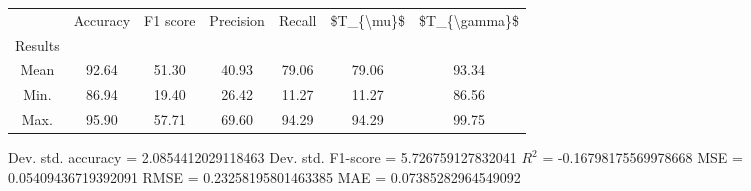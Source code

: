\begin{tabular}{|c|c|c|c|c|c|c|}
\toprule
{} &  Accuracy &  F1 score &  Precision &  Recall &  \$T\_\{\textbackslash mu\}\$ &  \$T\_\{\textbackslash gamma\}\$ \\
Results &           &           &            &         &            &               \\
\hline
Mean    &     92.64 &     51.30 &      40.93 &   79.06 &      79.06 &         93.34 \\
Min.    &     86.94 &     19.40 &      26.42 &   11.27 &      11.27 &         86.56 \\
Max.    &     95.90 &     57.71 &      69.60 &   94.29 &      94.29 &         99.75 \\
\bottomrule
\end{tabular}

 Dev. std. accuracy = 2.0854412029118463
 Dev. std. F1-score = 5.726759127832041
 $R^2$ = -0.16798175569978668
 MSE = 0.05409436719392091
 RMSE = 0.23258195801463385
 MAE = 0.07385282964549092